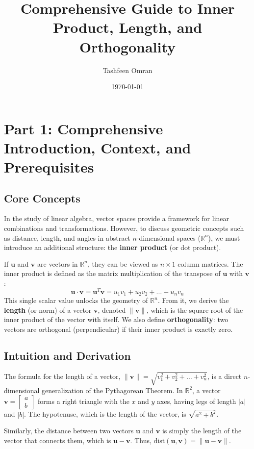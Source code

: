 \documentclass[11pt, letterpaper]{article}
\title{Comprehensive Guide to Inner Product, Length, and Orthogonality}
\author{Tashfeen Omran}
\date{\today}
\theoremstyle{definition}
\theoremstyle{remark}
\newcommand{\R}{\mathbb{R}}
\begin{document}
\maketitle
\tableofcontents
\newpage

\section{Part 1: Comprehensive Introduction, Context, and Prerequisites}

\subsection{Core Concepts}
In the study of linear algebra, vector spaces provide a framework for linear combinations and transformations. However, to discuss geometric concepts such as distance, length, and angles in abstract $n$-dimensional spaces ($\R^n$), we must introduce an additional structure: the \textbf{inner product} (or dot product). 

If $\mathbf{u}$ and $\mathbf{v}$ are vectors in $\R^n$, they can be viewed as $n \times 1$ column matrices. The inner product is defined as the matrix multiplication of the transpose of $\mathbf{u}$ with $\mathbf{v}$:
\[ \mathbf{u} \cdot \mathbf{v} = \mathbf{u}^T \mathbf{v} = u_1 v_1 + u_2 v_2 + \dots + u_n v_n \]
This single scalar value unlocks the geometry of $\R^n$. From it, we derive the \textbf{length} (or norm) of a vector $\mathbf{v}$, denoted $\|\mathbf{v}\|$, which is the square root of the inner product of the vector with itself. We also define \textbf{orthogonality}: two vectors are orthogonal (perpendicular) if their inner product is exactly zero.

\subsection{Intuition and Derivation}
The formula for the length of a vector, $\|\mathbf{v}\| = \sqrt{v_1^2 + v_2^2 + \dots + v_n^2}$, is a direct $n$-dimensional generalization of the Pythagorean Theorem. In $\R^2$, a vector $\mathbf{v} = \begin{bmatrix} a \\ b \end{bmatrix}$ forms a right triangle with the $x$ and $y$ axes, having legs of length $|a|$ and $|b|$. The hypotenuse, which is the length of the vector, is $\sqrt{a^2 + b^2}$. 

Similarly, the distance between two vectors $\mathbf{u}$ and $\mathbf{v}$ is simply the length of the vector that connects them, which is $\mathbf{u} - \mathbf{v}$. Thus, $\text{dist}(\mathbf{u}, \mathbf{v}) = \|\mathbf{u} - \mathbf{v}\|$.
\end{document}
